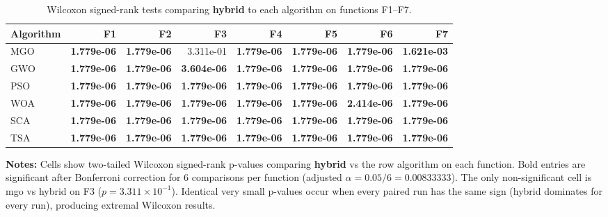 \documentclass[12pt,a4paper]{article}
\begin{document}
\begin{table}[ht]
\centering
\small
\begin{threeparttable}
\caption{Wilcoxon signed-rank tests comparing \textbf{hybrid} to each algorithm on functions F1--F7.}
\label{tab:hybrid_vs_algos_by_function}
\begin{tabular}{lrrrrrrr}
\toprule
Algorithm & F1 & F2 & F3 & F4 & F5 & F6 & F7 \\
\midrule
MGO   & \textbf{1.779e-06} & \textbf{1.779e-06} & 3.311e-01 & \textbf{1.779e-06} & \textbf{1.779e-06} & \textbf{1.779e-06} & \textbf{1.621e-03} \\
GWO   & \textbf{1.779e-06} & \textbf{1.779e-06} & \textbf{3.604e-06} & \textbf{1.779e-06} & \textbf{1.779e-06} & \textbf{1.779e-06} & \textbf{1.779e-06} \\
PSO   & \textbf{1.779e-06} & \textbf{1.779e-06} & \textbf{1.779e-06} & \textbf{1.779e-06} & \textbf{1.779e-06} & \textbf{1.779e-06} & \textbf{1.779e-06} \\
WOA   & \textbf{1.779e-06} & \textbf{1.779e-06} & \textbf{1.779e-06} & \textbf{1.779e-06} & \textbf{1.779e-06} & \textbf{2.414e-06} & \textbf{1.779e-06} \\
SCA   & \textbf{1.779e-06} & \textbf{1.779e-06} & \textbf{1.779e-06} & \textbf{1.779e-06} & \textbf{1.779e-06} & \textbf{1.779e-06} & \textbf{1.779e-06} \\
TSA & \textbf{1.779e-06} & \textbf{1.779e-06} & \textbf{1.779e-06} & \textbf{1.779e-06} & \textbf{1.779e-06} & \textbf{1.779e-06} & \textbf{1.779e-06} \\
\bottomrule
\end{tabular}
\begin{tablenotes}[flushleft]
\item \textbf{Notes:} Cells show two-tailed Wilcoxon signed-rank p-values comparing \textbf{hybrid} vs the row algorithm on each function. Bold entries are significant after Bonferroni correction for 6 comparisons per function (adjusted $\alpha=0.05/6 = 0.00833333$). The only non-significant cell is mgo vs hybrid on F3 ($p=3.311\times10^{-1}$). Identical very small p-values occur when every paired run has the same sign (hybrid dominates for every run), producing extremal Wilcoxon results.
\end{tablenotes}
\end{threeparttable}
\end{table}
\end{document}
